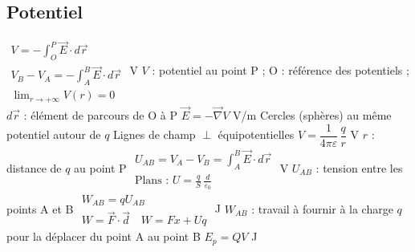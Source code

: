 \subsection{Potentiel}
\begin{formules}
    {$\begin{gathered}
      V = -\int_O^P \vec E\cdot d\vec r \\
      V_B - V_A = -\int_A^B \vec E\cdot d\vec r \\
      \lim_{r\to+\infty} V(r) = 0
     \end{gathered}$}
    {V}
    {$V$ : potentiel au point P ; O : référence des potentiels ; $d\vec r$ : élément de parcours de O à P}
    {$\vec E = -\vec\nabla V$}
    {V/m}
    {}
    {Cercles (sphères) au même potentiel autour de $q$}
    {}
    {
     Lignes de champ $\perp$ équipotentielles}
    {$V = \dfrac{1}{4\pi\varepsilon}\,\dfrac{q}{r}$}
    {V}
    {$r$ : distance de $q$ au point P}
    {$\begin{gathered}
      U_{AB} = V_A - V_B = \int_A^B \vec E\cdot d\vec r \\
      \text{Plans : } U = \frac{q}{S}\,\frac{d}{\varepsilon_0}
     \end{gathered}$}
    {V}
    {$U_{AB}$ : tension entre les points A et B}
    {$\begin{gathered}
      W_{AB} = qU_{AB} \\
      W = \vec F\cdot\vec d \quad W = Fx + Uq
     \end{gathered}$}
    {J}
    {$W_{AB}$ : travail à fournir à la charge $q$ pour la déplacer du point A au point B}
    {$E_p = QV$}
    {J}
    {}
\end{formules}


